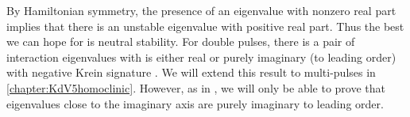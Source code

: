 \documentclass[thesis.tex]{subfiles}
\begin{document}
\noi By Hamiltonian symmetry, the presence of an eigenvalue with nonzero real part implies that there is an unstable eigenvalue with positive real part. Thus the best we can hope for is neutral stability. For double pulses, there is a pair of interaction eigenvalues with is either real or purely imaginary (to leading order) with negative Krein signature \cite[Theorem 2.3]{Pelinovsky2007}. We will extend this result to multi-pulses in \cref{chapter:KdV5homoclinic}. However, as in \cite{Pelinovsky2007}, we will only be able to prove that eigenvalues close to the imaginary axis are purely imaginary to leading order.

\iffulldocument\else
	
	
\fi
\end{document}
